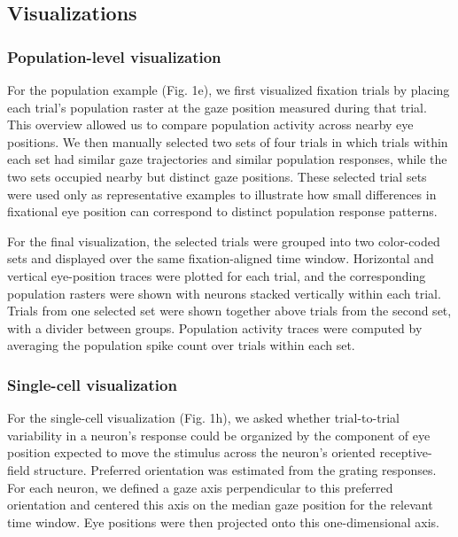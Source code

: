 \documentclass{lite}
\begin{document}
\subsection{Visualizations}

\subsubsection{Population-level visualization}

For the population example (Fig. 1e), we first visualized fixation trials by placing each trial's population raster at the gaze position measured during that trial. This overview allowed us to compare population activity across nearby eye positions. We then manually selected two sets of four trials in which trials within each set had similar gaze trajectories and similar population responses, while the two sets occupied nearby but distinct gaze positions. These selected trial sets were used only as representative examples to illustrate how small differences in fixational eye position can correspond to distinct population response patterns.

For the final visualization, the selected trials were grouped into two color-coded sets and displayed over the same fixation-aligned time window. Horizontal and vertical eye-position traces were plotted for each trial, and the corresponding population rasters were shown with neurons stacked vertically within each trial. Trials from one selected set were shown together above trials from the second set, with a divider between groups. Population activity traces were computed by averaging the population spike count over trials within each set.

\subsubsection{Single-cell visualization}

For the single-cell visualization (Fig. 1h), we asked whether trial-to-trial variability in a neuron's response could be organized by the component of eye position expected to move the stimulus across the neuron's oriented receptive-field structure. Preferred orientation was estimated from the grating responses. For each neuron, we defined a gaze axis perpendicular to this preferred orientation and centered this axis on the median gaze position for the relevant time window. Eye positions were then projected onto this one-dimensional axis.
\end{document}
